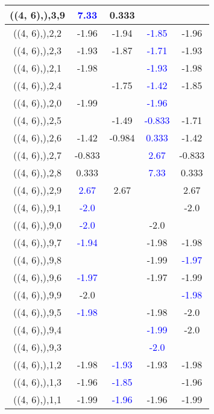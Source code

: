 \documentclass{article}
\begin{document}
\begin{center}
\begin{longtable}{|c|c|c|c|c|}
        	((4, 6),),3,9& \textcolor{blue}{7.33}&0.333&&\\
        	\hline
        	((4, 6),),2,2&-1.96&-1.94& \textcolor{blue}{-1.85}&-1.96\\
        	\hline
        	((4, 6),),2,3&-1.93&-1.87& \textcolor{blue}{-1.71}&-1.93\\
        	\hline
        	((4, 6),),2,1&-1.98&& \textcolor{blue}{-1.93}&-1.98\\
        	\hline
        	((4, 6),),2,4&&-1.75& \textcolor{blue}{-1.42}&-1.85\\
        	\hline
        	((4, 6),),2,0&-1.99&& \textcolor{blue}{-1.96}&\\
        	\hline
        	((4, 6),),2,5&&-1.49& \textcolor{blue}{-0.833}&-1.71\\
        	\hline
        	((4, 6),),2,6&-1.42&-0.984& \textcolor{blue}{0.333}&-1.42\\
        	\hline
        	((4, 6),),2,7&-0.833&& \textcolor{blue}{2.67}&-0.833\\
        	\hline
        	((4, 6),),2,8&0.333&& \textcolor{blue}{7.33}&0.333\\
        	\hline
        	((4, 6),),2,9& \textcolor{blue}{2.67}&2.67&&2.67\\
        	\hline
        	((4, 6),),9,1& \textcolor{blue}{-2.0}&&&-2.0\\
        	\hline
        	((4, 6),),9,0& \textcolor{blue}{-2.0}&&-2.0&\\
        	\hline
        	((4, 6),),9,7& \textcolor{blue}{-1.94}&&-1.98&-1.98\\
        	\hline
        	((4, 6),),9,8&&&-1.99& \textcolor{blue}{-1.97}\\
        	\hline
        	((4, 6),),9,6& \textcolor{blue}{-1.97}&&-1.97&-1.99\\
        	\hline
        	((4, 6),),9,9&-2.0&&& \textcolor{blue}{-1.98}\\
        	\hline
        	((4, 6),),9,5& \textcolor{blue}{-1.98}&&-1.98&-2.0\\
        	\hline
        	((4, 6),),9,4&&& \textcolor{blue}{-1.99}&-2.0\\
        	\hline
        	((4, 6),),9,3&&& \textcolor{blue}{-2.0}&\\
        	\hline
        	((4, 6),),1,2&-1.98& \textcolor{blue}{-1.93}&-1.93&-1.98\\
        	\hline
        	((4, 6),),1,3&-1.96& \textcolor{blue}{-1.85}&&-1.96\\
        	\hline
        	((4, 6),),1,1&-1.99& \textcolor{blue}{-1.96}&-1.96&-1.99\\

\end{longtable}
\end{center}
\end{document}
